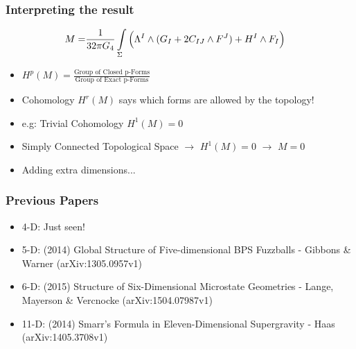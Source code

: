 \documentclass[t]{beamer}
\begin{document}
\begin{frame}
\frametitle{Interpreting the result}

\begin{align}
M =& \frac{1}{32\pi G_{4}} \int\limits_{\Sigma} \Big( \Lambda^I \wedge (G_I + 2C_{IJ} \wedge F^J ) + H^I \wedge F_{I}   \Big)\notag
\end{align}

\begin{itemize}
\setlength{\parskip}{10pt}

\item<2-> $H^p(M) = \frac{\text{Group of Closed p-Forms}}{\text{Group of Exact p-Forms}}$

\item<3-> Cohomology $H^r(M)$ says which forms are allowed by the topology!

\item<4-> e.g: Trivial Cohomology $H^{1}(M)= 0$ 

\item<5-> Simply Connected Topological Space $\rightarrow$ $H^{1}(M)= 0$ $\rightarrow$ $M=0$

\item<6-> Adding extra dimensions...
\end{itemize}
\end{frame}


\begin{frame}
\frametitle{Previous Papers}

\begin{itemize}
\setlength{\parskip}{18pt}
\item<1-> 4-D: Just seen!
\item<2-> 5-D: (2014) Global Structure of Five-dimensional BPS Fuzzballs - Gibbons \& Warner (arXiv:1305.0957v1)
\item<3-> 6-D: (2015) Structure of Six-Dimensional Microstate Geometries - Lange, Mayerson \& Vercnocke (arXiv:1504.07987v1)
\item<4-> 11-D: (2014) Smarr's Formula in Eleven-Dimensional Supergravity - Haas (arXiv:1405.3708v1)

\end{itemize}
\end{frame}

\end{document}
